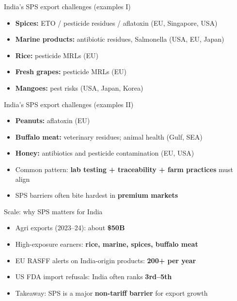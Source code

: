 \documentclass[
  ignorenonframetext,
  aspectratio=169,
]{beamer}
\makeatletter
\providecommand{\tightlist}{%
  \setlength{\itemsep}{0pt}\setlength{\parskip}{0pt}}
\let\quarto@originallabel\label
\DeclareRobustCommand*{\label}[1]{\quarto@originallabel{#1}}
\makeatother
\begin{document}
\begin{frame}{India's SPS export challenges (examples I)}
\label{indias-sps-export-challenges-examples-i}
\begin{itemize}
\tightlist
\item
  \textbf{Spices:} ETO / pesticide residues / aflatoxin (EU, Singapore,
  USA)
\item
  \textbf{Marine products:} antibiotic residues, Salmonella (USA, EU,
  Japan)
\item
  \textbf{Rice:} pesticide MRLs (EU)
\item
  \textbf{Fresh grapes:} pesticide MRLs (EU)
\item
  \textbf{Mangoes:} pest risks (USA, Japan, Korea)
\end{itemize}
\end{frame}

\begin{frame}{India's SPS export challenges (examples II)}
\label{indias-sps-export-challenges-examples-ii}
\begin{itemize}
\tightlist
\item
  \textbf{Peanuts:} aflatoxin (EU)
\item
  \textbf{Buffalo meat:} veterinary residues; animal health (Gulf, SEA)
\item
  \textbf{Honey:} antibiotics and pesticide contamination (EU, USA)
\item
  Common pattern: \textbf{lab testing + traceability + farm practices}
  must align
\item
  SPS barriers often bite hardest in \textbf{premium markets}
\end{itemize}
\end{frame}

\begin{frame}{Scale: why SPS matters for India}
\label{scale-why-sps-matters-for-india}
\begin{itemize}
\tightlist
\item
  Agri exports (2023--24): about \textbf{\$50B}
\item
  High-exposure earners: \textbf{rice, marine, spices, buffalo meat}
\item
  EU RASFF alerts on India-origin products: \textbf{200+ per year}
\item
  US FDA import refusals: India often ranks \textbf{3rd--5th}
\item
  Takeaway: SPS is a major \textbf{non-tariff barrier} for export growth
\end{itemize}
\end{frame}
\end{document}

